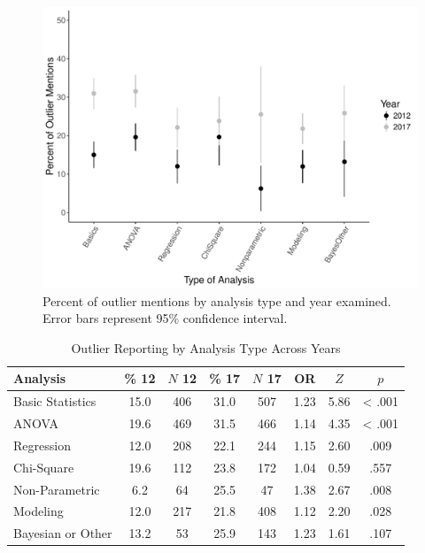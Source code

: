 \documentclass[english,man]{apa6}
\theoremstyle{definition}
\theoremstyle{definition}
\theoremstyle{definition}
\theoremstyle{remark}
\begin{document}
\begin{figure}
\centering
\includegraphics{outliers_manuscript_files/figure-latex/analyses-graph-1.pdf}
\caption{\label{fig:analyses-graph}Percent of outlier mentions by analysis
type and year examined. Error bars represent 95\% confidence interval.}
\end{figure}

\begin{table}[tbp]
\begin{center}
\begin{threeparttable}
\caption{\label{tab:analysis-table}Outlier Reporting by Analysis Type Across Years}
\begin{tabular}{lccccccc}
\toprule
Analysis & \% 12 & $N$ 12 & \% 17 & $N$ 17 & OR & $Z$ & $p$\\
\midrule
Basic Statistics & 15.0 & 406 & 31.0 & 507 & 1.23 & 5.86 & < .001\\
ANOVA & 19.6 & 469 & 31.5 & 466 & 1.14 & 4.35 & < .001\\
Regression & 12.0 & 208 & 22.1 & 244 & 1.15 & 2.60 & .009\\
Chi-Square & 19.6 & 112 & 23.8 & 172 & 1.04 & 0.59 & .557\\
Non-Parametric & 6.2 & 64 & 25.5 & 47 & 1.38 & 2.67 & .008\\
Modeling & 12.0 & 217 & 21.8 & 408 & 1.12 & 2.20 & .028\\
Bayesian or Other & 13.2 & 53 & 25.9 & 143 & 1.23 & 1.61 & .107\\
\bottomrule
\end{tabular}
\end{threeparttable}
\end{center}
\end{table}
\end{document}
